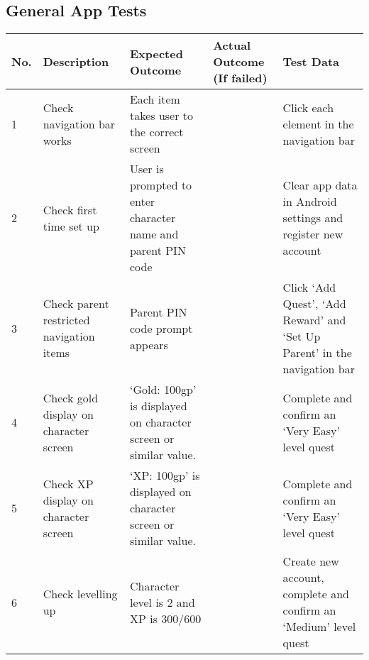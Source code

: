 \begin{landscape}
\section{General App Tests}
\begin{tabularx}{\linewidth}{p{1cm} X X X X}
\textbf{No.} & \textbf{Description}                    & \textbf{Expected Outcome}                                  	& \textbf{Actual Outcome (If failed)} & \textbf{Test Data}                                          \\ \hline
1            & Check navigation bar works               & Each item takes user to the correct screen                       &                                     & Click each element in the navigation bar                                  \\ \hline
2            & Check first time set up                  & User is prompted to enter character name and parent PIN code     &                                     & Clear app data in Android settings and register new account               \\ \hline
3            & Check parent restricted navigation items & Parent PIN code prompt appears                                   &                                     & Click `Add Quest', `Add Reward' and `Set Up Parent' in the navigation bar \\ \hline
4            & Check gold display on character screen   & `Gold: 100gp' is displayed on character screen or similar value. &                                     & Complete and confirm an `Very Easy' level quest                           \\ \hline
5            & Check XP display on character screen     & `XP: 100gp' is displayed on character screen or similar value.   &                                     & Complete and confirm an `Very Easy' level quest                           \\ \hline
6            & Check levelling up                       & Character level is 2 and XP is 300/600                           &                                     & Create new account, complete and confirm an `Medium' level quest          \\ \hline
\end{tabularx} 


\end{landscape}
